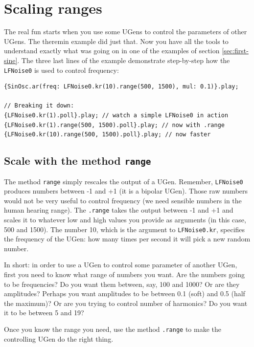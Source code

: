\section{Scaling ranges}

The real fun starts when you use some UGens to control the parameters of other UGens. The theremin example did just that. Now you have all the tools to understand exactly what was going on in one of the examples of section \ref{sec:first-sine}. The three last lines of the example demonstrate step-by-step how the \texttt{LFNoise0} is used to control frequency:

\begin{lstlisting}[style=SuperCollider-IDE, basicstyle=\scttfamily\footnotesize]
{SinOsc.ar(freq: LFNoise0.kr(10).range(500, 1500), mul: 0.1)}.play;

// Breaking it down:
{LFNoise0.kr(1).poll}.play; // watch a simple LFNoise0 in action
{LFNoise0.kr(1).range(500, 1500).poll}.play; // now with .range
{LFNoise0.kr(10).range(500, 1500).poll}.play; // now faster
\end{lstlisting}

\subsection{Scale with the method \texttt{range}}
The method \texttt{range} simply rescales the output of a UGen. Remember, \texttt{LFNoise0} produces numbers between -1 and +1 (it is a bipolar UGen). Those raw numbers would not be very useful to control frequency (we need sensible numbers in the human hearing range). The \texttt{.range} takes the output between -1 and +1 and scales it to whatever low and high values you provide as arguments (in this case, 500 and 1500). The number 10, which is the argument to \texttt{LFNoise0.kr}, specifies the frequency of the UGen: how many times per second it will pick a new random number.

In short: in order to use a UGen to control some parameter of another UGen, first you need to know what range of numbers you want. Are the numbers going to be frequencies? Do you want them between, say, 100 and 1000? Or are they amplitudes? Perhaps you want amplitudes to be between 0.1 (soft) and 0.5 (half the maximum)? Or are you trying to control number of harmonics? Do you want it to be between 5 and 19? 

Once you know the range you need, use the method \texttt{.range} to make the controlling UGen do the right thing.

